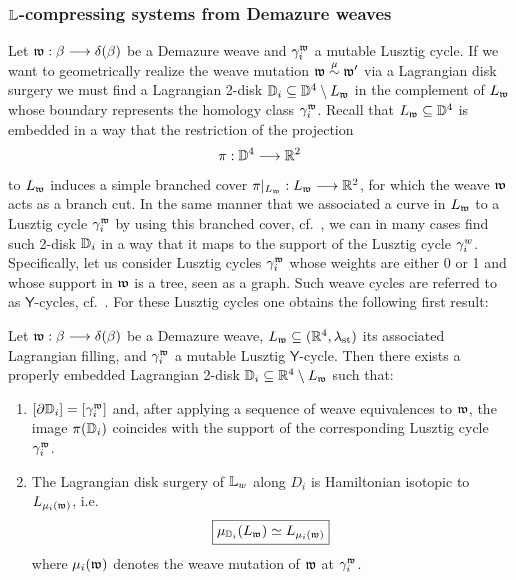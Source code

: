 
\subsubsection{$\mathbb{L}$-compressing systems from Demazure weaves}\label{sssec:L_compressing_systems_via_weaves} Let $\mathfrak{w}:\beta\longrightarrow\delta(\beta)$ be a Demazure weave and $\gamma_i^{\mathfrak{w}}$ a mutable Lusztig cycle. If we want to geometrically realize the weave mutation $\mathfrak{w}\stackrel{\mu}{\sim}\mathfrak{w}'$ via a Lagrangian disk surgery we must find a Lagrangian 2-disk $\mathbb{D}_i\subseteq\mathbb{D}^4\setminus L_{\mathfrak{w}}$ in the complement of $L_{\mathfrak{w}}$ whose boundary represents the homology class $\gamma_i^{\mathfrak{w}}$. Recall that $L_{\mathfrak{w}}\subseteq\mathbb{D}^4$ is embedded in a way that the restriction of the projection
$$\pi:\mathbb{D}^4\longrightarrow\mathbb{R}^2$$
to $L_{\mathfrak{w}}$ induces a simple branched cover $\pi|_{L_{\mathfrak{w}}}:L_{\mathfrak{w}}\longrightarrow\mathbb{R}^2$, for which the weave $\mathfrak{w}$ acts as a branch cut. In the same manner that we associated a curve in $L_{\mathfrak{w}}$ to a Lusztig cycle $\gamma_i^{\mathfrak{w}}$ by using this branched cover, cf.~, we can in many cases find such 2-disk $\mathbb{D}_i$ in a way that it maps to the support of the Lusztig cycle $\gamma_i^w$. Specifically, let us consider Lusztig cycles $\gamma_i^{\mathfrak{w}}$ whose weights are either 0 or 1 and whose support in $\mathfrak{w}$ is a tree, seen as a graph. Such weave cycles are referred to as $\mathsf{Y}$-cycles, cf.~\cite{CasalsWeng22,CasalsZaslow}. For these Lusztig cycles one obtains the following first result:

\begin{proposition}\label{prop:compressing_disk_Lusztig_cycle}
Let $\mathfrak{w}:\beta\longrightarrow\delta(\beta)$ be a Demazure weave, $L_{\mathfrak{w}}\subseteq(\mathbb{R}^4,\lambda_{\text{st}})$ its associated Lagrangian filling, and $\gamma_i^{\mathfrak{w}}$ a mutable Lusztig $\mathsf{Y}$-cycle. Then there exists a properly embedded Lagrangian 2-disk $\mathbb{D}_i\subseteq\mathbb{R}^4\setminus L_{\mathfrak{w}}$ such that:\\
\begin{enumerate}
    \item $[\partial\mathbb{D}_i]=[\gamma_i^{\mathfrak{w}}]$ and, after applying a sequence of weave equivalences to $\mathfrak{w}$, the image $\pi(\mathbb{D}_i)$ coincides with the support of the corresponding Lusztig cycle $\gamma_i^{\mathfrak{w}}$.\\

    \item The Lagrangian disk surgery of $\mathbb{L}_w$ along $D_i$ is Hamiltonian isotopic to $L_{\mu_i(\mathfrak{w})}$, i.e.~
        \begin{equation}\label{eq:mutation_via_fillings2}
        \fbox{$\mu_{\mathbb{D}_i}(L_{\mathfrak{w}})\simeq L_{\mu_i(\mathfrak{w})}$}
        \end{equation}
    where $\mu_i(\mathfrak{w})$ denotes the weave mutation of $\mathfrak{w}$ at $\gamma_i^{\mathfrak{w}}$.\sbs
\end{enumerate}
\end{proposition}

